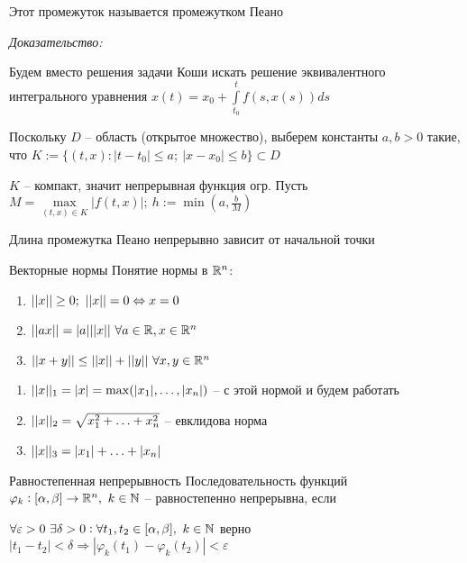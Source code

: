 \documentclass[12pt]{article}
\begin{document}
\begin{Remark}{}
    Этот промежуток называется промежутком Пеано
\end{Remark}

\textit{Доказательство:}

Будем вместо решения задачи Коши искать решение эквивалентного интегрального уравнения $x(t) = x_0 + \int\limits_{t_0}^t f(s, x(s))ds$

Поскольку $D$ -- область (открытое множество), выберем константы $a, b > 0$ такие, что $K := \{(t, x) : |t - t_0| \leq a;\ |x - x_0| \leq b\} \subset D$

$K$ -- компакт, значит непрерывная функция огр. Пусть $M = \max\limits_{(t, x) \in K} |f(t, x)|;\ h := \min(a, \frac{b}{M})$

\begin{Remark}{}
    Длина промежутка Пеано непрерывно зависит от начальной точки 
\end{Remark}

\begin{defin}{Векторные нормы}
    Понятие нормы в $\mathbb R^n$:

    \begin{enumerate}
        \item $|| x || \geq 0;\ || x || = 0 \Leftrightarrow x = 0$
        \item $|| ax || = |a||| x ||\ \forall a \in \mathbb R, x \in \mathbb R^n$
        \item $\parl{x + y} \leq \parl{x} + \parl{y}\ \forall x, y \in \R^n$
    \end{enumerate}
\end{defin}

\begin{Example}{}
    \begin{enumerate}
        \item $|| x ||_1 = |x| = \max(|x_1|, \ldots, |x_n|)$ -- с этой нормой и будем работать
        \item $|| x ||_2 = \sqrt{x_1^2 + \ldots + x_n^2}$ -- евклидова норма
        \item $|| x ||_3 = |x_1| + \ldots + |x_n|$
    \end{enumerate}
\end{Example}

\begin{defin}{Равностепенная непрерывность}
    Последовательность функций $\varphi_k : [\alpha, \beta] \to \mathbb R^n,\ k \in \mathbb N$ -- равностепенно непрерывна, если 
    
    $\forall \varepsilon > 0\ \exists \delta > 0 : \forall t_1, t_2 \in [\alpha, \beta],\ k \in \mathbb N$ верно $|t_1 - t_2| < \delta \Rightarrow |\varphi_k(t_1) - \varphi_k(t_2)| < \varepsilon$
\end{defin}
\end{document}
